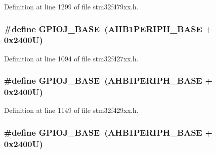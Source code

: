 Definition at line 1299 of file stm32f479xx.\+h.

\subsubsection[{\texorpdfstring{G\+P\+I\+O\+J\+\_\+\+B\+A\+SE}{GPIOJ_BASE}}]{\setlength{\rightskip}{0pt plus 5cm}\#define G\+P\+I\+O\+J\+\_\+\+B\+A\+SE~({\bf A\+H\+B1\+P\+E\+R\+I\+P\+H\+\_\+\+B\+A\+SE} + 0x2400\+U)}\hypertarget{group___peripheral__memory__map_ga73f5a4e42f41acc614ee82c8ebfe0b85}{}\label{group___peripheral__memory__map_ga73f5a4e42f41acc614ee82c8ebfe0b85}


Definition at line 1094 of file stm32f427xx.\+h.

\subsubsection[{\texorpdfstring{G\+P\+I\+O\+J\+\_\+\+B\+A\+SE}{GPIOJ_BASE}}]{\setlength{\rightskip}{0pt plus 5cm}\#define G\+P\+I\+O\+J\+\_\+\+B\+A\+SE~({\bf A\+H\+B1\+P\+E\+R\+I\+P\+H\+\_\+\+B\+A\+SE} + 0x2400\+U)}\hypertarget{group___peripheral__memory__map_ga73f5a4e42f41acc614ee82c8ebfe0b85}{}\label{group___peripheral__memory__map_ga73f5a4e42f41acc614ee82c8ebfe0b85}


Definition at line 1149 of file stm32f429xx.\+h.

\subsubsection[{\texorpdfstring{G\+P\+I\+O\+J\+\_\+\+B\+A\+SE}{GPIOJ_BASE}}]{\setlength{\rightskip}{0pt plus 5cm}\#define G\+P\+I\+O\+J\+\_\+\+B\+A\+SE~({\bf A\+H\+B1\+P\+E\+R\+I\+P\+H\+\_\+\+B\+A\+SE} + 0x2400\+U)}\hypertarget{group___peripheral__memory__map_ga73f5a4e42f41acc614ee82c8ebfe0b85}{}\label{group___peripheral__memory__map_ga73f5a4e42f41acc614ee82c8ebfe0b85}


